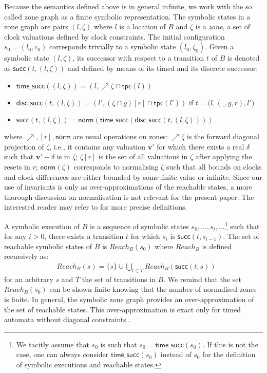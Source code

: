 \documentclass{LMCS}
\newcommand{\msucc}{\mathsf{succ}}
\newcommand{\dsucc}{\mathsf{disc}\_\mathsf{succ}}
\newcommand{\tsucc}{\mathsf{time}\_\mathsf{succ}}
\newcommand{\inv}{\mathsf{tpc}}
\newcommand{\close}{\mathsf{norm}}
\newcommand{\reach}{\mathit{Reach}}
\newcommand{\cn}{\mathit{B}\xspace}
\theoremstyle{plain}\newtheorem{remark}[thm]{Remark}
\theoremstyle{plain}\newtheorem{example}[thm]{Example}
\begin{document}
Because the semantics defined above is in general infinite, we work with
the so called zone graph \cite{henzinger94} as a finite symbolic
representation. The symbolic states in a zone graph are pairs $(l, \zeta)$
where $l$ is a location of $\cn$ and $\zeta$ is a \textit{zone}, a set of
clock valuations defined by clock constraints.  The initial configuration
$s_0=(l_0,c_0)$ corresponds trivially to a symbolic state $(l_0, \zeta_0)$.
Given a symbolic state $(l,\zeta)$, its successor with respect to a
transition $t$ of $\cn$ is denoted as $\msucc(t, (l,\zeta))$ and defined by
means of its timed and its discrete successor:
\begin{itemize}
\item $\tsucc((l,\zeta)) = (l,\nearrow\zeta \cap \inv(l))$
\item $\dsucc(t, (l,\zeta)) = (l',(\zeta \cap g)[r]\cap \inv(l'))$ if $t = \big(l, (\_, g, r), l'\big)$
\item $\msucc(t, (l,\zeta)) = \close(\tsucc(\dsucc(t, (l, \zeta))))$
\end{itemize}
where $\nearrow, [r], \close$ are usual operations on zones: $\nearrow
\zeta$ is the forward diagonal projection of $\zeta$, i.e., it
contains any valuation $\mathbf{v'}$ for which there exists a real
$\delta$ such that $\mathbf{v'}-\delta$ is in $\zeta$; $\zeta[r]$ is
the set of all valuations in $\zeta$ after applying the resets in $r$;
$\close(\zeta)$ corresponds to normalising $\zeta$ such that all
bounds on clocks and clock differences are either bounded by some
finite value or infinite. Since our use of invariants is only as
over-approximations of the reachable states, a more thorough
discussion on normalisation is not relevant for the present paper. The
interested reader may refer to \cite{bengtssonY03,bouyer04} for more
precise definitions.

A symbolic execution of $\cn$ is a sequence of
symbolic states $s_0, \dots, s_i, \dots$\footnote{We tacitly assume that
  $s_0$ is such that $s_0=\tsucc{(s_0)}$.  If this is not the case, one can
  always consider $\tsucc{(s_0)}$ instead of $s_0$ for the definition of symbolic
  executions and reachable states.} such that for any $i> 0$, there exists
a transition $t$ for which $s_i$ is $\msucc(t, s_{i-1})$. The set of
reachable symbolic states of $\cn$ is $\reach_B(s_0)$
where $\reach_B$ is defined recursively as:
\begin{align*}
 & \reach_B(s) = \{s\} \cup \displaystyle{\bigcup_{t\in T}} \reach_B(\msucc(t, s))
\end{align*}
for an arbitrary $s$ and $T$ the set of transitions in $\cn$.  We remind
that the set $\reach_B(s_0)$ can be shown finite knowing that the number
of normalised zones is finite.  In general, the symbolic zone graph
provides an over-approximation of the set of reachable states.  This
over-approximation is exact only for timed automata without diagonal
constraints \cite{bengtssonY03, bouyer04}.
\end{document}
